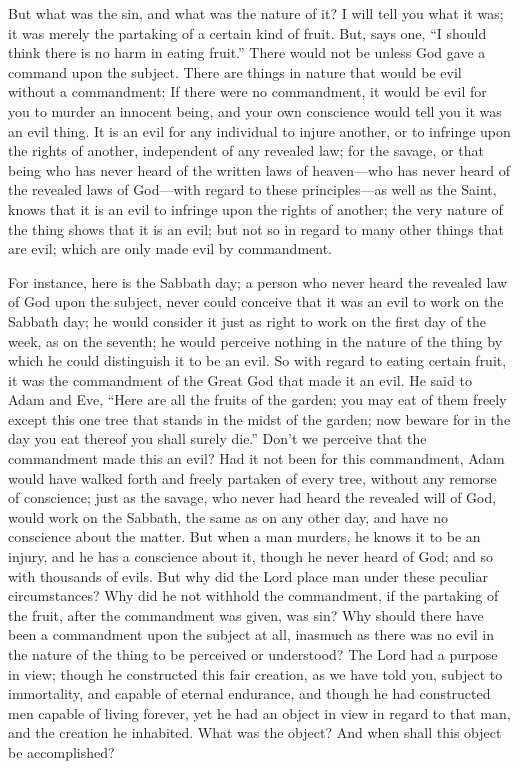 But what was the sin, and what was the nature of it? I will tell you what it was; it was merely
the partaking of a certain kind of fruit. But, says one, ``I should think there is no harm in
eating fruit.'' There would not be unless God gave a command upon the subject. There are
things in nature that would be evil without a commandment: If there were no commandment,
it would be evil for you to murder an innocent being, and your own conscience would tell
you it was an evil thing. It is an evil for any individual to injure another, or to infringe upon
the rights of another, independent of any revealed law; for the savage, or that being who has
never heard of the written laws of heaven—who has never heard of the revealed laws of
God—with regard to these principles—as well as the Saint, knows that it is an evil to infringe
upon the rights of another; the very nature of the thing shows that it is an evil; but not so in
regard to many other things that are evil; which are only made evil by commandment.

For instance, here is the Sabbath day; a person who never heard the revealed law of God
upon the subject, never could conceive that it was an evil to work on the Sabbath day; he
would consider it just as right to work on the first day of the week, as on the seventh; he
would perceive nothing in the nature of the thing by which he could distinguish it to be an
evil. So with regard to eating certain fruit, it was the commandment of the Great God that
made it an evil. He said to Adam and Eve, ``Here are all the fruits of the garden; you may eat
of them freely except this one tree that stands in the midst of the garden; now beware for in
the day you eat thereof you shall surely die.'' Don't we perceive that the commandment made
this an evil? Had it not been for this commandment, Adam would have walked forth and
freely partaken of every tree, without any remorse of conscience; just as the savage, who
never had heard the revealed will of God, would work on the Sabbath, the same as on any
other day, and have no conscience about the matter. But when a man murders, he knows it to
be an injury, and he has a conscience about it, though he never heard of God; and so with
thousands of evils. But why did the Lord place man under these peculiar circumstances?
Why did he not withhold the commandment, if the partaking of the fruit, after the
commandment was given, was sin? Why should there have been a commandment upon the
subject at all, inasmuch as there was no evil in the nature of the thing to be perceived or
understood? The Lord had a purpose in view; though he constructed this fair creation, as we
have told you, subject to immortality, and capable of eternal endurance, and though he had
constructed men capable of living forever, yet he had an object in view in regard to that man,
and the creation he inhabited. What was the object? And when shall this object be
accomplished?

